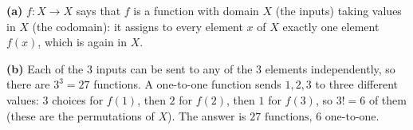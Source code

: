 \textbf{(a)} $f:X\to X$ says that $f$ is a function with domain $X$ (the inputs) taking values in $X$ (the codomain): it assigns to every element $x$ of $X$ exactly one element $f(x)$, which is again in $X$.

\textbf{(b)} Each of the $3$ inputs can be sent to any of the $3$ elements independently, so there are $3^3=27$ functions. A one-to-one function sends $1,2,3$ to three different values: $3$ choices for $f(1)$, then $2$ for $f(2)$, then $1$ for $f(3)$, so $3!=6$ of them (these are the permutations of $X$). The answer is $\boxed{27\text{ functions, }6\text{ one-to-one}}$.
